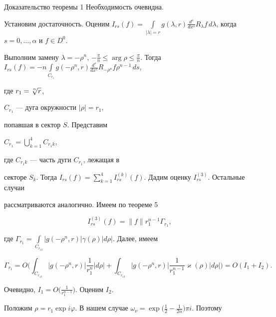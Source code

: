 \begin{pf*}{Доказательство теоремы 1} Необходимость очевидна.





Установим достаточность. Оценим $I_{rs}(f)=


\int\limits_{|\lambda|=r}g(\lambda,r) \frac {d^s}{dx^s}


R_\lambda f\,d\lambda$, когда $s=0,\dotsc,\alpha$ и $f\in D^0$.


Выполним замену $\lambda=-\rho^n$, $- \frac {\pi}n\le\arg\rho


\le \frac {\pi}n$. Тогда $I_{rs}(f)=-n\int\limits_{C_{r_1}}


g(-\rho^n,r) \frac {d^s}{dx^s}R_{-\rho^n}f\rho^{n-1}\,ds$,


где $r_1=\sqrt[\uproot{2}n]{r}$,


$C_{r_1}$ --- дуга окружности $|\rho|=r_1$,


попавшая в сектор $S$. Представим


$C_{r_1}=\bigcup\limits^4_{k=1} C_{r_1k}$,


где $C_{r_1k}$ --- часть дуги $C_{r_1}$, лежащая в


секторе $S_k$. Тогда $I_{rs}(f)=\sum\limits_{k=1}^4I_{rs}^{(k)}


(f)$. Дадим оценку $I_{rs}^{(3)}$. Остальные случаи


рассматриваются аналогично. Имеем по теореме 5


\begin{equation}


I_{rs}^{(3)}(f)=\|f\|r_1^{n-1}\Gamma_{r_1},


\end{equation}


где $\Gamma_{r_1}=\int\limits_{C_{r_13}}|g(-\rho^n,r)|\gamma


(\rho)|d\rho|$. Далее, имеем


$$


\Gamma_{r_1}=O\bigg(\int_{C_{r_13}}|g(-\rho^n,r)| \frac


1{r_1^n}|d\rho|+\int_{C_{r_13}}|g(-\rho^n,r)| \frac 1


{r_1^{n-1}}\varkappa(\rho)|d\rho|\bigg)=O(I_1+I_2).


$$


Очевидно, $I_1=O\big( \frac 1{r_1^{n-1}}\big)$. Оценим $I_2$.


Положим $\rho=r_1\exp i\varphi$. В нашем случае $\omega_\nu=


\exp\big( \frac 12- \frac 1{2n}\big)\pi i$. Поэтому



\end{pf*}
